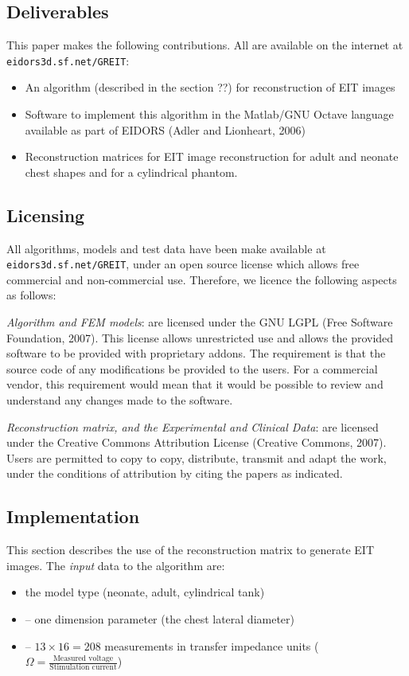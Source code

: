 \documentclass[12pt]{iopart}
\begin{document}
\subsection{Deliverables}

This paper makes the following contributions. All are
available on the internet at \verb+eidors3d.sf.net/GREIT+:
\begin{itemize}
\item An algorithm (described in the section ??) for reconstruction
         of EIT images
\item Software to implement this algorithm in the Matlab/GNU Octave
         language available as part of EIDORS (Adler and Lionheart, 2006)
\item Reconstruction matrices for EIT image reconstruction for
      adult and neonate chest shapes and for a cylindrical phantom.
\end{itemize}


\subsection{Licensing}
All algorithms, models and test data have been make
available at \verb+eidors3d.sf.net/GREIT+,
under an open source license which allows
free commercial and non-commercial use. Therefore,
we licence the following aspects as follows:

{\em Algorithm and FEM models}:
   are licensed under the GNU LGPL (Free Software Foundation, 2007).
   This license allows
   unrestricted use and allows the provided software to
   be provided with proprietary addons. The requirement is
   that the source code of any modifications be provided to
   the users. For a commercial vendor, this requirement would
   mean that it would be possible to review and understand any
   changes made to the software.

{\em Reconstruction matrix, and the Experimental and Clinical Data}:
   are licensed under the Creative Commons Attribution
   License (Creative Commons, 2007). Users are permitted
   to copy to copy, distribute, transmit and adapt the work,
   under the conditions of attribution by citing the
   papers as indicated.

\subsection{Implementation }
This section describes the use of the reconstruction
matrix to generate EIT images.
The {\em input} data to the algorithm are:
\begin{itemize}
\item[]
the model type (neonate, adult, cylindrical tank) 
\item[]
   -- one dimension parameter (the chest lateral diameter) 
\item[]
   -- $13\times 16=208$ measurements in transfer impedance units
      ($\Omega = \frac{\mbox{Measured voltage}}
                      {\mbox{Stimulation current}}$)
\end{itemize}
\end{document}
